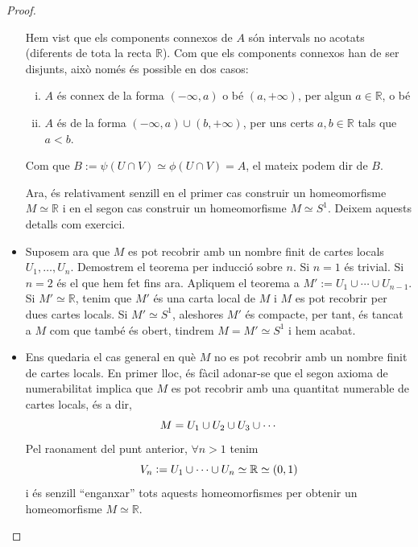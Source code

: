 \documentclass[../main.tex]{subfiles}
\begin{document}
\begin{proof}
\begin{itemize}
    Hem vist que els components connexos de $A$ són intervals no acotats (diferents de tota la recta $\mathbb{R}$). Com que els components connexos han de ser disjunts, això només és possible en dos casos:
    \begin{enumerate}[i.]
        \item $A$ és connex de la forma $(-\infty,a)$ o bé $(a,+\infty)$, per algun $a\in \mathbb{R}$, o bé
        \item $A$ és de la forma $(-\infty,a)\cup (b,+\infty)$, per uns certs $a,b\in\mathbb{R}$ tals que $a<b$.
    \end{enumerate}
    Com que $B:=\psi(U\cap V)\simeq \phi(U\cap V) = A$, el mateix podem dir de $B$.
    
    Ara, és relativament senzill en el primer cas construir un homeomorfisme $M\simeq \mathbb{R}$ i en el segon cas construir un homeomorfisme $M\simeq S^1$. Deixem aquests detalls com exercici.
    
    \item Suposem ara que $M$ es pot recobrir amb un nombre finit de cartes locals $U_1,\ldots,U_n$. Demostrem el teorema per inducció sobre $n$. Si $n=1$ és trivial. Si $n=2$ és el que hem fet fins ara. Apliquem el teorema a $M':=U_1\cup \cdots\cup U_{n-1}$. Si $M'\simeq \mathbb{R}$, tenim que $M'$ és una carta local de $M$ i $M$ es pot recobrir per dues cartes locals. Si $M'\simeq S^1$, aleshores $M'$ és compacte, per tant, és tancat a $M$  com que també és obert, tindrem $M = M'\simeq S^1$ i hem acabat.
    
    \item Ens quedaria el cas general en què $M$ no es pot recobrir amb un nombre finit de cartes locals. En primer lloc, és fàcil adonar-se que el segon axioma de numerabilitat implica que $M$ es pot recobrir amb una quantitat numerable de cartes locals, és a dir,
    \begin{equation}
        \notag
        M = U_1\cup U_2\cup U_3\cup \cdots
    \end{equation}
    Pel raonament del punt anterior, $\forall n>1$ tenim
    \begin{equation}
        \notag
        V_n:=U_1\cup\cdots\cup U_n\simeq \mathbb{R}\simeq (0,1)
    \end{equation}
    i és senzill ``enganxar'' tots aquests homeomorfismes per obtenir un homeomorfisme $M\simeq\mathbb{R}$.
\end{itemize}
\end{proof}
\end{document}
